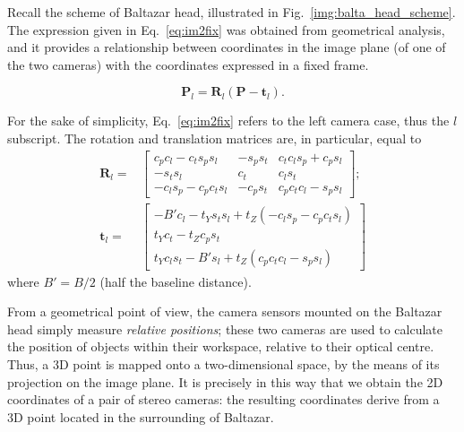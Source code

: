 Recall the scheme of Baltazar head, illustrated in Fig.~\ref{img:balta_head_scheme}. The expression given in Eq.~\ref{eq:im2fix} was obtained from geometrical analysis, and it provides a relationship between coordinates in the image plane (of one of the two cameras) with the coordinates expressed in a fixed frame.

\begin{equation}\label{eq:im2fix}
{\mathbf{P}}_l = {\mathbf{R}}_l (\mathbf{P} - {\mathbf{t}}_l).
\end{equation}

For the sake of simplicity, Eq.~\ref{eq:im2fix} refers to the left camera case, thus the $l$ subscript. The rotation and translation matrices are, in particular, equal to
%
\begin{equation}
\begin{split}
{\mathbf{R}}_l =	&\begin{bmatrix}
				c_p c_l - c_t s_p s_l	&	- s_p s_t	&	c_t c_l s_p + c_p s_l \\
				- s_t s_l			&	c_t		&	c_l s_t \\
				- c_l s_p - c_p c_t s_l&	- c_p s_t	&	c_p c_t c_l - s_p s_l
				\end{bmatrix}; \\
{\mathbf{t}}_l =		&\begin{bmatrix}
				- B' c_l - t_Y s_t s_l + t_Z (- c_l s_p - c_p c_t s_l) \\
				t_Y c_t - t_Z c_p s_t \\
				t_Y c_l s_t - B' s_l + t_Z (c_p c_t c_l - s_p s_l)
				\end{bmatrix}
\end{split}
\end{equation}
%
where $B' = B/2$ (half the baseline distance).







From a geometrical point of view, the camera sensors mounted on the Baltazar head simply measure \emph{relative positions}; these two cameras are used to calculate the position of objects within their workspace, relative to their optical centre. Thus, a 3D point is mapped onto a two-dimensional space, by the means of its projection on the image plane. It is precisely in this way that we obtain the 2D coordinates of a pair of stereo cameras: the resulting coordinates derive from a 3D point located in the surrounding of Baltazar.






